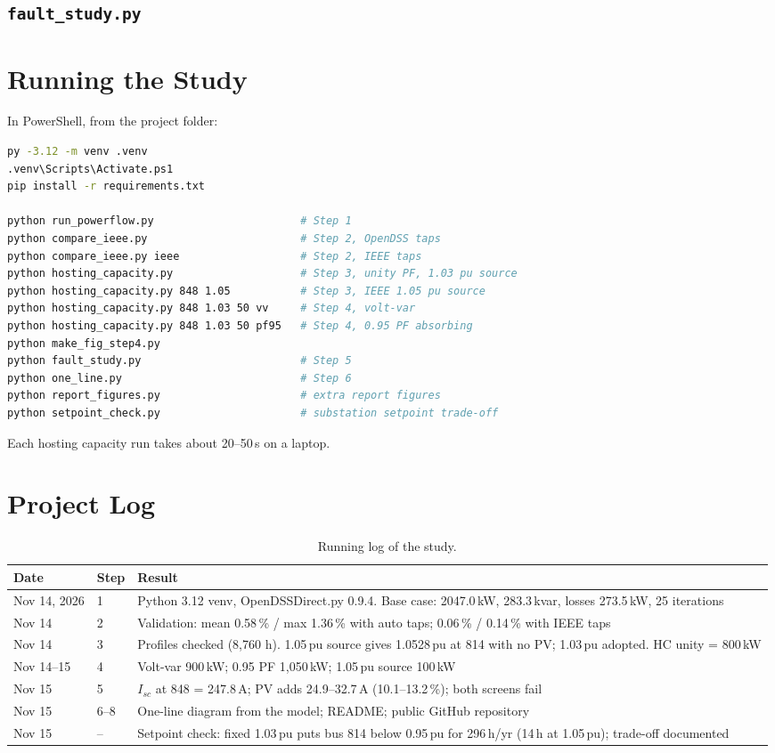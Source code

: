 \documentclass[11pt,letterpaper]{article}
\begin{document}
\subsection{\texttt{fault\_study.py}}


\section{Running the Study}
\label{app:run}
In PowerShell, from the project folder:
\begin{lstlisting}[language=bash, numbers=none]
py -3.12 -m venv .venv
.venv\Scripts\Activate.ps1
pip install -r requirements.txt

python run_powerflow.py                       # Step 1
python compare_ieee.py                        # Step 2, OpenDSS taps
python compare_ieee.py ieee                   # Step 2, IEEE taps
python hosting_capacity.py                    # Step 3, unity PF, 1.03 pu source
python hosting_capacity.py 848 1.05           # Step 3, IEEE 1.05 pu source
python hosting_capacity.py 848 1.03 50 vv     # Step 4, volt-var
python hosting_capacity.py 848 1.03 50 pf95   # Step 4, 0.95 PF absorbing
python make_fig_step4.py
python fault_study.py                         # Step 5
python one_line.py                            # Step 6
python report_figures.py                      # extra report figures
python setpoint_check.py                      # substation setpoint trade-off
\end{lstlisting}
Each hosting capacity run takes about 20--50\,s on a laptop.

\section{Project Log}
\begin{table}[H]
\centering
\small
\begin{tabular}{@{}p{2.1cm}p{1.6cm}p{11.3cm}@{}}
\toprule
Date & Step & Result \\
\midrule
Nov 14, 2026 & 1 & Python 3.12 venv, OpenDSSDirect.py 0.9.4. Base case: 2047.0\,kW, 283.3\,kvar, losses 273.5\,kW, 25 iterations \\
Nov 14 & 2 & Validation: mean 0.58\,\% / max 1.36\,\% with auto taps; 0.06\,\% / 0.14\,\% with IEEE taps \\
Nov 14 & 3 & Profiles checked (8{,}760 h). 1.05\,pu source gives 1.0528\,pu at 814 with no PV; 1.03\,pu adopted. HC unity = 800\,kW \\
Nov 14--15 & 4 & Volt-var 900\,kW; 0.95 PF 1{,}050\,kW; 1.05\,pu source 100\,kW \\
Nov 15 & 5 & $I_{sc}$ at 848 = 247.8\,A; PV adds 24.9--32.7\,A (10.1--13.2\,\%); both screens fail \\
Nov 15 & 6--8 & One-line diagram from the model; README; public GitHub repository \\
Nov 15 & -- & Setpoint check: fixed 1.03\,pu puts bus 814 below 0.95\,pu for 296\,h/yr (14\,h at 1.05\,pu); trade-off documented \\
\bottomrule
\end{tabular}
\caption{Running log of the study.}
\end{table}
\end{document}
